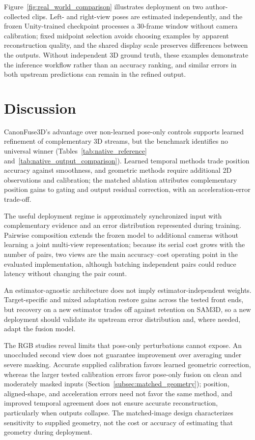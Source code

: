 \documentclass[preprint,12pt]{elsarticle}
\begin{document}
Figure~\ref{fig:real_world_comparison} illustrates deployment on two author-collected clips. Left- and right-view poses are estimated independently, and the frozen Unity-trained checkpoint processes a 30-frame window without camera calibration; fixed midpoint selection avoids choosing examples by apparent reconstruction quality, and the shared display scale preserves differences between the outputs. Without independent 3D ground truth, these examples demonstrate the inference workflow rather than an accuracy ranking, and similar errors in both upstream predictions can remain in the refined output.



\FloatBarrier
\section{Discussion}
\label{sec:discussion}

CanonFuse3D's advantage over non-learned pose-only controls supports learned refinement of complementary 3D streams, but the benchmark identifies no universal winner (Tables~\ref{tab:native_reference} and~\ref{tab:native_output_comparison}). Learned temporal methods trade position accuracy against smoothness, and geometric methods require additional 2D observations and calibration; the matched ablation attributes complementary position gains to gating and output residual correction, with an acceleration-error trade-off.

The useful deployment regime is approximately synchronized input with complementary evidence and an error distribution represented during training. Pairwise composition extends the frozen model to additional cameras without learning a joint multi-view representation; because its serial cost grows with the number of pairs, two views are the main accuracy--cost operating point in the evaluated implementation, although batching independent pairs could reduce latency without changing the pair count.

An estimator-agnostic architecture does not imply estimator-independent weights. Target-specific and mixed adaptation restore gains across the tested front ends, but recovery on a new estimator trades off against retention on SAM3D, so a new deployment should validate its upstream error distribution and, where needed, adapt the fusion model.

The RGB studies reveal limits that pose-only perturbations cannot expose. An unoccluded second view does not guarantee improvement over averaging under severe masking. Accurate supplied calibration favors learned geometric correction, whereas the larger tested calibration errors favor pose-only fusion on clean and moderately masked inputs (Section~\ref{subsec:matched_geometry}); position, aligned-shape, and acceleration errors need not favor the same method, and improved temporal agreement does not ensure accurate reconstruction, particularly when outputs collapse. The matched-image design characterizes sensitivity to supplied geometry, not the cost or accuracy of estimating that geometry during deployment.
\end{document}
